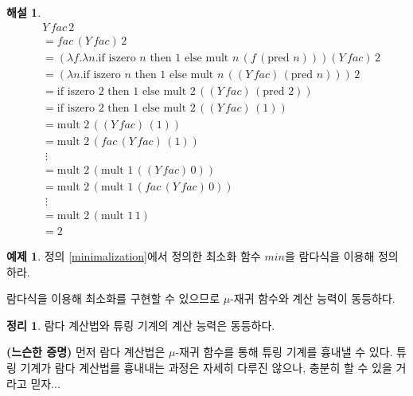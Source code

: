 \documentclass[b5paper, 11pt]{book}
\theoremstyle{definition}
\newtheorem{thm}[defn]{정리}
\newtheorem{ex}[defn]{예제}
\newtheorem*{ans*}{해설}
\newenvironment{pf*}{\pushQED{\qed}\pf}
{\popQED\endpf}
\begin{document}
\begin{ans*}
    \begin{align*}
        &Y \, fac \, 2 \\ 
        &= fac \, (Y \, fac) \, 2 \\ 
        &= (\lambda f. \lambda n. \text{if } \text{iszero } n \text{ then }
        1 \text{ else } \text{mult } n \, (f \, (\text{pred } n))) (Y \, fac) \, 2 \\
        &= (\lambda n. \text{if } \text{iszero } n \text{ then }
        1 \text{ else } \text{mult } n \, ((Y \, fac) \, (\text{pred } n))) \, 2 \\
        &=   \text{if } \text{iszero } 2 \text{ then }
        1 \text{ else } \text{mult } 2 \, ((Y \, fac) \, (\text{pred } 2))\\
        &=  \text{if } \text{iszero } 2 \text{ then }
        1 \text{ else } \text{mult } 2 \, ((Y \, fac) \, (1)) \\ 
        &= \text{mult } 2 \, ((Y \, fac) \, (1)) \\
        &= \text{mult } 2 \, (fac \, (Y \, fac) \, (1)) \\ 
        &\; \vdots \\ 
        &= \text{mult } 2 \, (\text{mult } 1 \, ((Y \, fac) \, 0)) \\
        &= \text{mult } 2 \, (\text{mult } 1 \, (fac \, (Y \, fac) \, 0)) \\ 
        &\; \vdots \\ 
        &= \text{mult } 2 \, (\text{mult } 1 \, 1) \\
        &= 2 
    \end{align*}
\end{ans*}
\begin{ex}
    정의 \ref{minimalization}에서 정의한 최소화 함수 $min$을 람다식을 이용해 정의하라.
\end{ex}
람다식을 이용해 최소화를 구현할 수 있으므로 $\mu$-재귀 함수와 계산 능력이 동등하다. 
\begin{thm}
    람다 계산법와 튜링 기계의 계산 능력은 동등하다.
\end{thm}
\begin{pf*}
    \textbf{(느슨한 증명)}
    먼저 람다 계산법은 $\mu$-재귀 함수를 통해 튜링 기계를 흉내낼 수 있다. 튜링 기계가 람다 계산법를 흉내내는 과정은 자세히 다루진 않으나, 충분히 할 수 있을 거라고 믿자...
\end{pf*}
\end{document}
